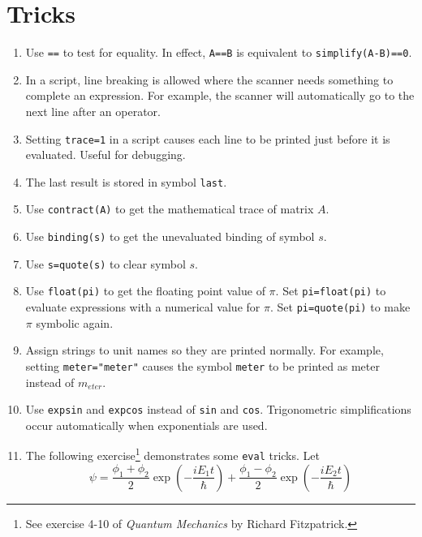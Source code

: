 

\section*{Tricks}

\begin{enumerate}

\item
Use \verb$==$ to test for equality.
In effect, \verb$A==B$ is equivalent to \verb$simplify(A-B)==0$.

\item
In a script, line breaking is allowed where the scanner needs something to complete an expression.
For example, the scanner will automatically go to the next line after an operator.

\item
Setting \verb$trace=1$ in a script causes each line to be printed just before it is evaluated.
Useful for debugging.

\item
The last result is stored in symbol \verb$last$.

\item
Use \verb$contract(A)$ to get the mathematical trace of matrix $A$.

\item
Use \verb$binding(s)$ to get the unevaluated binding of symbol $s$.

\item
Use \verb$s=quote(s)$ to clear symbol $s$.

\item
Use \verb$float(pi)$ to get the floating point value of $\pi$.
Set \verb$pi=float(pi)$ to evaluate expressions with a numerical value for $\pi$.
Set \verb$pi=quote(pi)$ to make $\pi$ symbolic again.

\item
Assign strings to unit names so they are printed normally.
For example, setting \verb$meter="meter"$ causes the symbol \verb$meter$
to be printed as meter instead of $m_{eter}$.

\item
Use \verb$expsin$ and \verb$expcos$ instead of \verb$sin$ and \verb$cos$.
Trigonometric simplifications occur automatically when exponentials are used.

\item
The following exercise\footnote{See exercise 4-10 of {\it Quantum Mechanics} by Richard Fitzpatrick.}
demonstrates some \verb$eval$ tricks.
Let
\begin{equation*}
\psi
=\frac{\phi_1+\phi_2}{2}\exp\left(-\frac{iE_1t}{\hbar}\right)
+\frac{\phi_1-\phi_2}{2}\exp\left(-\frac{iE_2t}{\hbar}\right)
\end{equation*}


\end{enumerate}
